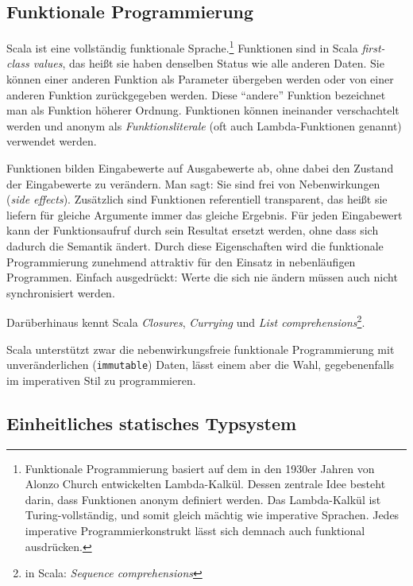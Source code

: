 \documentclass[a4paper, 12pt, hidelinks, listof=totoc, listoftables=totoc, bibliography=totoc]{scrreprt}
\begin{document}
\subsection{Funktionale Programmierung}


Scala ist eine vollständig funktionale Sprache.\footnote{
	Funktionale Programmierung basiert auf dem in den 1930er Jahren von Alonzo Church entwickelten Lambda-Kalkül. Dessen zentrale Idee besteht darin, dass Funktionen anonym definiert werden. Das Lambda-Kalkül ist Turing-vollständig, und somit gleich mächtig wie imperative Sprachen. Jedes imperative Programmierkonstrukt lässt sich demnach auch funktional ausdrücken.}
Funktionen sind in Scala \textit{first-class values}, das heißt sie haben denselben Status wie alle anderen Daten. Sie können einer anderen Funktion als Parameter übergeben werden oder von einer anderen Funktion zurückgegeben werden. Diese "`andere"' Funktion bezeichnet man als Funktion höherer Ordnung. Funktionen können ineinander verschachtelt werden und anonym als \textit{Funktionsliterale} (oft auch Lambda-Funktionen genannt) verwendet werden.

Funktionen bilden Eingabewerte auf Ausgabewerte ab, ohne dabei den Zustand der Eingabewerte zu verändern. Man sagt: Sie sind frei von Nebenwirkungen (\textit{side effects}). Zusätzlich sind Funktionen referentiell transparent, das heißt sie liefern für gleiche Argumente immer das gleiche Ergebnis. Für jeden Eingabewert kann der Funktionsaufruf durch sein Resultat ersetzt werden, ohne dass sich dadurch die Semantik ändert. Durch diese Eigenschaften wird die funktionale Programmierung zunehmend attraktiv für den Einsatz in nebenläufigen Programmen. Einfach ausgedrückt: Werte die sich nie ändern müssen auch nicht synchronisiert werden.

Darüberhinaus kennt Scala \textit{Closures}, \textit{Currying} und \textit{List comprehensions}\footnote{
	in Scala: \textit{Sequence comprehensions}
}.

Scala unterstützt zwar die nebenwirkungsfreie funktionale Programmierung mit unveränderlichen (\texttt{immutable}) Daten, lässt einem aber die Wahl, gegebenenfalls im imperativen Stil zu programmieren.\cite[S. 6 ff.]{piepmeyer2010.GFP}\cite[S. 10 ff.]{odersky2008.PIS}

\subsection{Einheitliches statisches Typsystem}
\end{document}
